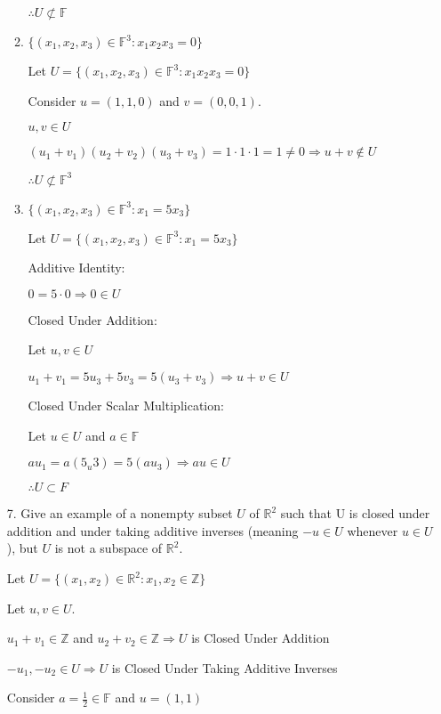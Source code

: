 \documentclass{article}
\begin{document}
\begin{enumerate}[nolistsep]
\begin{enumerate}[nolistsep]
			$\therefore U \not\subset \mathbb{F}$
			
			
			\item ${\{(x_1, x_2, x_3) \in \mathbb{F}^3 : x_1x_2x_3 = 0 \}}$
			
			Let $U = {\{(x_1, x_2, x_3) \in \mathbb{F}^3 : x_1x_2x_3 = 0 \}}$
			
			Consider $u = (1, 1, 0)$ and $v = (0, 0, 1)$.
			
			$u, v \in U$
			
			$(u_1 + v_1)(u_2 + v_2)(u_3 + v_3) = 1 \cdot 1 \cdot 1 = 1 \neq 0 \Rightarrow u + v \notin U$
			
			$\therefore U \not\subset \mathbb{F}^3$
			
			
			\item ${\{(x_1, x_2, x_3) \in \mathbb{F}^3 : x_1 = 5x_3 \}}$
			
			Let $U = \{(x_1, x_2, x_3) \in \mathbb{F}^3 : x_1 = 5x_3 \}$
			
			Additive Identity:
			
			$0 = 5 \cdot 0 \Rightarrow 0 \in U$
			
			Closed Under Addition:
			
			Let $u, v \in U$
			
			$u_1 + v_1 = 5u_3 + 5v_3 = 5(u_3 + v_3) \Rightarrow u + v \in U$
			
			Closed Under Scalar Multiplication:
			
			Let $u \in U$ and $a \in \mathbb{F}$
			
			$au_1 = a(5_u3) = 5(au_3) \Rightarrow au \in U$
			
			$\therefore U \subset F$
			
		\end{enumerate}
		
		\item[7.] Give an example of a nonempty subset $U$ of $\mathbb{R}^2$ such that U is closed under addition and under taking additive inverses (meaning $-u \in U$ whenever $u \in U$), but $U$ is not a subspace of $\mathbb{R}^2$.
		
		Let $U = \{(x_1, x_2) \in \mathbb{R}^2 : x_1, x_2 \in \mathbb{Z}\}$
		
		Let $u, v \in U$.
		
		$u_1 + v_1 \in \mathbb{Z}$ and $u_2 + v_2 \in \mathbb{Z} \Rightarrow U$ is Closed Under Addition
		
		$-u_1, -u_2 \in U \Rightarrow U$ is Closed Under Taking Additive Inverses
		
		Consider $a = \frac{1}{2} \in \mathbb{F}$ and $u = (1, 1)$
		

\end{enumerate}
\end{document}
